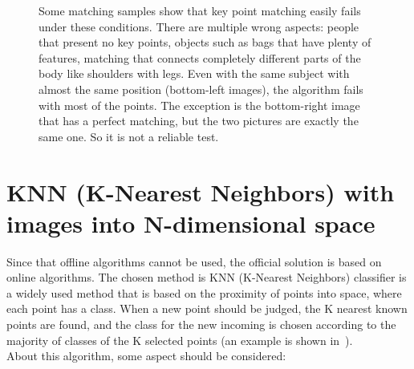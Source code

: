 \begin{figure}[!h]
\begin{subfigure}[!h]{0.24\textwidth}
	\end{subfigure}
	\captionsetup{margin=0.5cm}
	\caption[Key points matching samples of people comparison.]{Some matching samples show that key point matching easily fails under these conditions. There are multiple wrong aspects: people that present no key points, objects such as bags that have plenty of features, matching that connects completely different parts of the body like shoulders with legs. Even with the same subject with almost the same position (bottom-left images), the algorithm fails with most of the points. The exception is the bottom-right image that has a perfect matching, but the two pictures are exactly the same one. So it is not a reliable test.}
	\label{fig:kpMatch_samples}
\end{figure}


\section{KNN (K-Nearest Neighbors) with images into N-dimensional space}\label{sec:knn}
Since that offline algorithms cannot be used, the official solution is based on online algorithms. The chosen method is KNN (K-Nearest Neighbors) classifier is a widely used method that is based on the proximity of points into space, where each point has a class. When a new point should be judged, the K nearest known points are found, and the class for the new incoming is chosen according to the majority of classes of the K selected points (an example is shown in~).\\
About this algorithm, some aspect should be considered:

